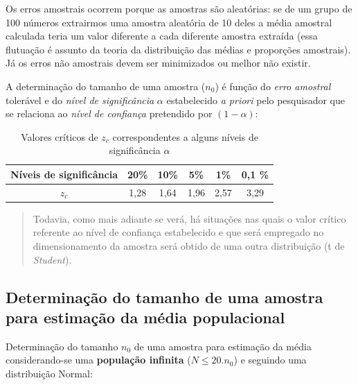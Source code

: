 \documentclass[
]{book}
\begin{document}
\hfill\break

Os erros amostrais ocorrem porque as amostras são aleatórias: se de um grupo de 100 números extrairmos uma amostra aleatória de 10 deles a média amostral calculada teria um valor diferente a cada diferente amostra extraída (essa flutuação é assunto da teoria da distribuição das médias e proporções amostrais). Já os erros não amostrais devem ser minimizados ou melhor não existir.

\hfill\break

A determinação do tamanho de uma amostra (\(n_{0}\)) é função do \emph{erro amostral} tolerável e do \emph{nível de significância} \(\alpha\) estabelecido \emph{a priori} pelo pesquisador que se relaciona ao \emph{nível de confiança} pretendido por \((1-\alpha)\):

\hfill\break

\begin{table}[h]
\centering
\caption{Valores críticos de $z_{c}$ correspondentes a alguns níveis de significância $\alpha$}
\begin{tabular}{|c|c|c|c|c|c|}
\hline 
Níveis de significância & 20\% & 10\% & 5\%  & 1\%  & 0,1 \%   \\ 
\hline 
$z_{c}$  & 1,28 & 1,64 & 1,96 & 2,57 & 3,29  \\
\hline 
\end{tabular} 
\end{table}

\hfill\break

\hfill\break

\begin{quote}
Todavia, como mais adiante se verá, há situações nas quais o valor crítico referente ao nível de confiança estabelecido e que será empregado no dimensionamento da amostra será obtido de uma outra distribuição (t de \emph{Student}).
\end{quote}

\hfill\break

\hypertarget{determinauxe7uxe3o-do-tamanho-de-uma-amostra-para-estimauxe7uxe3o-da-muxe9dia-populacional}{%
\subsection{Determinação do tamanho de uma amostra para estimação da média populacional}\label{determinauxe7uxe3o-do-tamanho-de-uma-amostra-para-estimauxe7uxe3o-da-muxe9dia-populacional}}

\hfill\break

Determinação do tamanho \(n_{0}\) de uma amostra para estimação da média considerando-se uma \textbf{população infinita} (\(N \le 20.n_{0}\)) e seguindo uma distribuição Normal:
\end{document}
